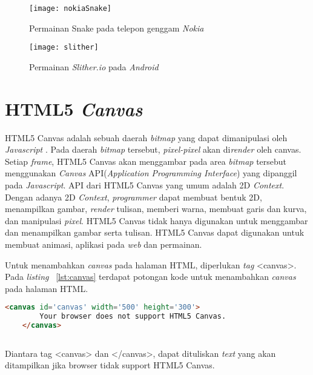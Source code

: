 \begin{figure}[H]
	\centering  
	\texttt{[image: nokiaSnake]}  
	\caption[Permainan Snake pada telepon genggam \textit{Nokia}]{Permainan Snake pada telepon genggam \textit{Nokia}} 
	\label{fig:nokiaSnake} 
\end{figure} 

\begin{figure}[H]
	\centering  
	\texttt{[image: slither]}  
	\caption[Permainan \textit{Slither.io} pada \textit{Android}]{Permainan \textit{Slither.io} pada \textit{Android}} 
	\label{fig:slither} 
\end{figure} 

\section{HTML5 \textit{Canvas}}
\label{sec:HTML5Canvas}
HTML5 Canvas adalah sebuah daerah \textit{bitmap} yang dapat dimanipulasi oleh \textit{Javascript} \cite{fulton2013html5}. Pada daerah \textit{bitmap} tersebut, \textit{pixel-pixel} akan di\textit{render} oleh canvas. Setiap \textit{frame}, HTML5 Canvas akan menggambar pada area \textit{bitmap} tersebut menggunakan \textit{Canvas} API(\textit{Application Programming Interface}) yang dipanggil pada \textit{Javascript}. API dari HTML5 Canvas yang umum adalah 2D \textit{Context}. Dengan adanya 2D \textit{Context}, \textit{programmer} dapat membuat bentuk 2D, menampilkan gambar, \textit{render} tulisan, memberi warna, membuat garis dan kurva, dan manipulasi \textit{pixel}. HTML5 Canvas tidak hanya digunakan untuk menggambar dan menampilkan gambar serta tulisan. HTML5 Canvas dapat digunakan untuk membuat animasi, aplikasi pada \textit{web} dan permainan. 

Untuk menambahkan \textit{canvas} pada halaman HTML, diperlukan \textit{tag} <canvas>. Pada \textit{listing} ~\ref{lst:canvas} terdapat potongan kode untuk menambahkan \textit{canvas} pada halaman HTML. 

\begin{lstlisting}[language=HTML, caption=Menambahkan \textit{canvas}, label={lst:canvas}]
	<canvas id='canvas' width='500' height='300'>
		Your browser does not support HTML5 Canvas.
	</canvas>
	
\end{lstlisting}

Diantara tag <canvas> dan </canvas>, dapat dituliskan \textit{text} yang akan ditampilkan jika browser tidak support HTML5 Canvas. 

